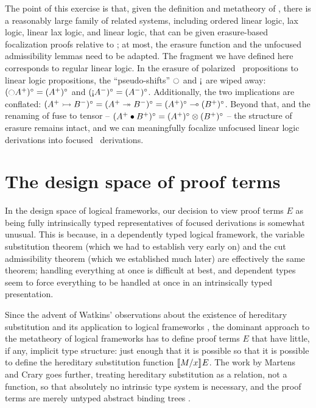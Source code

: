 The point of this exercise is that, given the definition and
metatheory of \ollll, there is a reasonably large family of related
systems, including ordered linear logic, lax logic, linear lax logic, and
linear logic, that can be given erasure-based focalization proofs
relative to \ollll; at most, the erasure function and the unfocused
admissibility lemmas need to be adapted. The fragment we have defined
here corresponds to regular linear logic. In the erasure of polarized
\ollll~propositions to linear logic propositions, the
``pseudo-shifts'' ${\ocircle}$ and ${\gnab}$ are wiped away:
$({\ocircle}A^+)^\circ = (A^+)^\circ$ and $({\gnab}A^-)^\circ =
(A^-)^\circ$.  Additionally, the two implications are conflated: $(A^+
\rightarrowtail B^-)^\circ = (A^+ \twoheadrightarrow B^-)^\circ = (A^+)^\circ \multimap
(B^+)^\circ$. Beyond that, and the renaming of fuse to tensor -- $(A^+
\mathbin{\bullet} B^+)^\circ = (A^+)^\circ \otimes (B^+)^\circ$ -- the structure
of erasure remains intact, and we can 
meaningfully focalize unfocused linear logic derivations into focused 
\ollll~derivations.

\section{The design space of proof terms}
\label{sec:intrinsic-extrinsic}

In the design space of logical frameworks, our decision to view
proof terms $E$ as being fully intrinsically typed representatives
of focused derivations is somewhat unusual. This is because, in 
a dependently typed logical framework, the variable substitution
theorem (which we had to establish very early on) and the cut 
admissibility theorem (which we established much later) are effectively
the same theorem; handling everything at once is difficult at best,
and dependent types seem to force everything to be handled at once in
an intrinsically typed presentation.

Since the advent of Watkins' observations about the existence of
hereditary substitution and its application to logical frameworks
\cite{watkins02concurrent}, the dominant approach to the metatheory of
logical frameworks has to define proof terms $E$ that have little, if
any, implicit type structure: just enough that it is possible so that
it is possible to define the hereditary substitution function
$\llbracket {M}/{x} \rrbracket^{} {E}$. The work by Martens and Crary goes further,
treating hereditary substitution as a relation, not a function, so
that absolutely no intrinsic type system is necessary, and the proof
terms are merely untyped abstract binding trees
\cite{martens12lf}.

